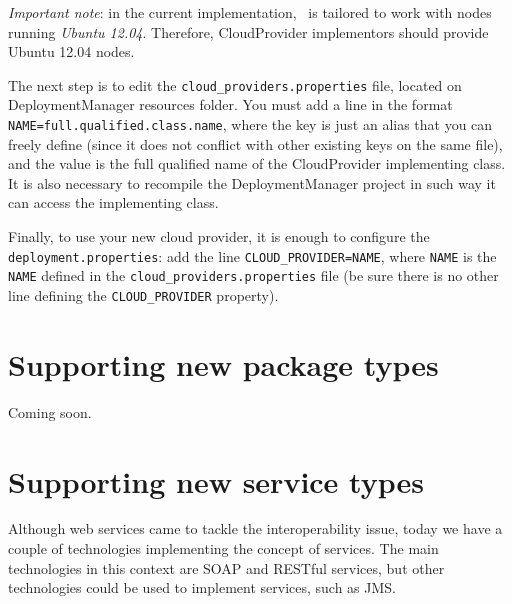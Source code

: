 \emph{Important note}: in the current implementation, \ee\ is tailored to work with nodes running \emph{Ubuntu 12.04}. Therefore, \textsf{CloudProvider} implementors should provide Ubuntu 12.04 nodes. 

The next step is to edit the \texttt{cloud\_providers.properties} file, located on DeploymentManager resources folder. You must add a line in the format \verb!NAME=full.qualified.class.name!, where the key is just an alias that you can freely define (since it does not conflict with other existing keys on the same file), and the value is the full qualified name of the \textsf{CloudProvider} implementing class. It is also necessary to recompile the DeploymentManager project in such way it can access the implementing class.

Finally, to use your new cloud provider, it is enough to configure the \texttt{deployment.properties}: add the line \verb!CLOUD_PROVIDER=NAME!, where \verb!NAME! is the \verb!NAME! defined in the \texttt{cloud\_providers.properties} file (be sure there is no other line defining the \verb!CLOUD_PROVIDER! property).

\section{Supporting new package types}

Coming soon.

%
%
%
%


\section{Supporting new service types}

Although web services came to tackle the interoperability issue, today we have a couple of technologies implementing the concept of services.
The main technologies in this context are SOAP and RESTful services, but other technologies could be used to implement services, such as JMS.

